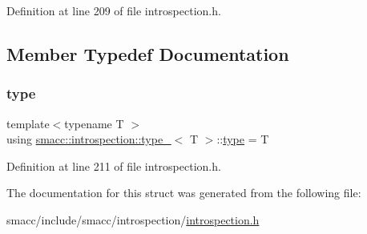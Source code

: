 Definition at line 209 of file introspection.\+h.



\subsection{Member Typedef Documentation}
\mbox{\label{structsmacc_1_1introspection_1_1type___afe9e4516cea9d3160f2eff1b787ca4f5}} 
\subsubsection{\texorpdfstring{type}{type}}
{\footnotesize\ttfamily template$<$typename T $>$ \\
using \hyperlink{structsmacc_1_1introspection_1_1type__}{smacc\+::introspection\+::type\+\_\+}$<$ T $>$\+::\hyperlink{structsmacc_1_1introspection_1_1type___afe9e4516cea9d3160f2eff1b787ca4f5}{type} =  T}



Definition at line 211 of file introspection.\+h.



The documentation for this struct was generated from the following file\+:\begin{DoxyCompactItemize}
\item 
smacc/include/smacc/introspection/\hyperlink{introspection_8h}{introspection.\+h}\end{DoxyCompactItemize}
